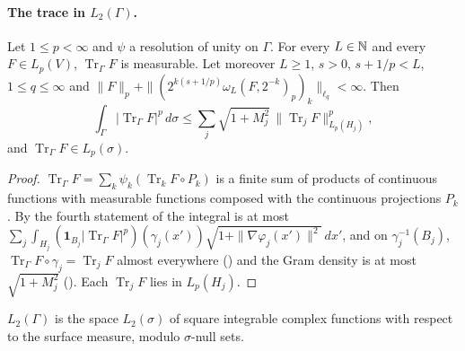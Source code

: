 \paragraph{The trace in $L_2(\Gamma)$.}

\begin{theorem}
\label{thm:boundary-trace-lp}
\leanok
{}
Let $1 \leq p < \infty$ and $\psi$ a resolution of unity on $\Gamma$. For every $L \in \mathbb{N}$ and
every $F \in L_p(V)$, $\operatorname{Tr}_\Gamma F$ is measurable. Let moreover $L \geq 1$, $s > 0$,
$s + 1/p < L$, $1 \leq q \leq \infty$ and
$\|F\|_p + \|(2^{k(s + 1/p)} \omega_L(F, 2^{-k})_p)_k\|_{\ell_q} < \infty$. Then
\[
  \int_\Gamma |\operatorname{Tr}_\Gamma F|^p \, d\sigma
  \leq \sum_j \sqrt{1 + M_j^2} \, \|\operatorname{Tr}_j F\|_{L_p(H_j)}^p ,
\]
and $\operatorname{Tr}_\Gamma F \in L_p(\sigma)$.
\end{theorem}

\begin{proof}
\leanok
$\operatorname{Tr}_\Gamma F = \sum_k \psi_k (\operatorname{Tr}_k F \circ P_k)$ is a finite sum of
products of continuous functions with measurable functions composed with the continuous
projections $P_k$. By the fourth statement of  the integral is at
most $\sum_j \int_{H_j} (\mathbf 1_{B_j} |\operatorname{Tr}_\Gamma F|^p)(\gamma_j(x'))
\sqrt{1 + \|\nabla\varphi_j(x')\|^2} \, dx'$, and on $\gamma_j^{-1}(B_j)$,
$\operatorname{Tr}_\Gamma F \circ \gamma_j = \operatorname{Tr}_j F$ almost everywhere
() and the Gram density is at most $\sqrt{1 + M_j^2}$
(). Each $\operatorname{Tr}_j F$ lies in $L_p(H_j)$.
\end{proof}

\begin{definition}
\label{def:boundary-l2}
\leanok
{}
$L_2(\Gamma)$ is the space $L_2(\sigma)$ of square integrable complex functions with respect to
the surface measure, modulo $\sigma$-null sets.
\end{definition}


